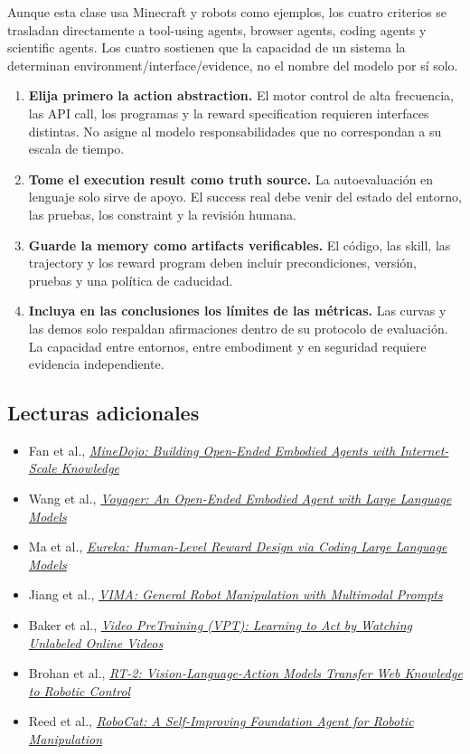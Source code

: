 \documentclass[a4paper]{article}
\begin{document}
Aunque esta clase usa Minecraft y robots como ejemplos, los cuatro criterios se trasladan directamente a tool-using agents, browser agents, coding agents y scientific agents. Los cuatro sostienen que la capacidad de un sistema la determinan environment/interface/evidence, no el nombre del modelo por sí solo.

\begin{enumerate}
  \item \textbf{Elija primero la action abstraction.} El motor control de alta frecuencia, las API call, los programas y la reward specification requieren interfaces distintas. No asigne al modelo responsabilidades que no correspondan a su escala de tiempo.
  \item \textbf{Tome el execution result como truth source.} La autoevaluación en lenguaje solo sirve de apoyo. El success real debe venir del estado del entorno, las pruebas, los constraint y la revisión humana.
  \item \textbf{Guarde la memory como artifacts verificables.} El código, las skill, las trajectory y los reward program deben incluir precondiciones, versión, pruebas y una política de caducidad.
  \item \textbf{Incluya en las conclusiones los límites de las métricas.} Las curvas y las demos solo respaldan afirmaciones dentro de su protocolo de evaluación. La capacidad entre entornos, entre embodiment y en seguridad requiere evidencia independiente.
\end{enumerate}

\subsection{Lecturas adicionales}

\begingroup
\footnotesize
\begin{itemize}[itemsep=0pt,topsep=0.15em,parsep=0pt]
  \item Fan et al., \href{https://arxiv.org/abs/2206.08853}{\emph{MineDojo: Building Open-Ended Embodied Agents with Internet-Scale Knowledge}}
  \item Wang et al., \href{https://arxiv.org/abs/2305.16291}{\emph{Voyager: An Open-Ended Embodied Agent with Large Language Models}}
  \item Ma et al., \href{https://arxiv.org/abs/2310.12931}{\emph{Eureka: Human-Level Reward Design via Coding Large Language Models}}
  \item Jiang et al., \href{https://arxiv.org/abs/2210.03094}{\emph{VIMA: General Robot Manipulation with Multimodal Prompts}}
  \item Baker et al., \href{https://arxiv.org/abs/2206.11795}{\emph{Video PreTraining (VPT): Learning to Act by Watching Unlabeled Online Videos}}
  \item Brohan et al., \href{https://arxiv.org/abs/2307.15818}{\emph{RT-2: Vision-Language-Action Models Transfer Web Knowledge to Robotic Control}}
  \item Reed et al., \href{https://arxiv.org/abs/2306.11706}{\emph{RoboCat: A Self-Improving Foundation Agent for Robotic Manipulation}}
\end{itemize}
\end{document}
